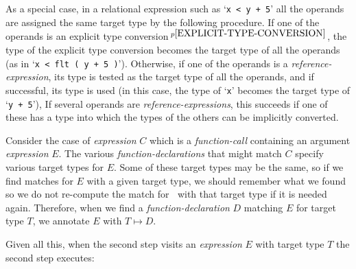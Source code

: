 \documentclass[12pt]{article}
\newcommand{\pagnote}[1]{$\,^{p\pageref{#1}}$}
\begin{document}
As a special case, in a relational expression such as `{\tt x < y + 5}'
all the operands are assigned the same target type by the following
procedure.
If one of the operands is
an explicit type conversion\pagnote{EXPLICIT-TYPE-CONVERSION},
the type of the explicit type conversion
becomes the target type of all the operands
(as in `{\tt x < flt ( y + 5 )}').
Otherwise, if
one of the operands is a {\em reference-expression},
its type is tested as the target type of all the operands,
and if successful, its type is used
(in this case, the type of `{\tt x}' becomes the target type of `{\tt y + 5}'),
If several operands are {\em reference-expressions}, this succeeds if
one of these has a type into which the types of the others can be
implicitly converted.

Consider the case of {\em expression} $C$ which is a {\em function-call}
containing an argument {\em expression} $E$.  The various
{\em function-declarations} that might match $C$ specify various
target types for $E$.  Some of these target types may be the same,
so if we find matches for $E$ with a given target type, we should
remember what we found so we do not re-compute the match for $~$ with
that target type if it is needed again.  Therefore, when we find a
{\em function-declaration} $D$ matching $E$ for target type $T$, we annotate
$E$ with $T\mapsto D$.

Given all this, when the second step visits an {\em expression} $E$ with
target type $T$ the second step executes:


\bigskip
\end{document}
